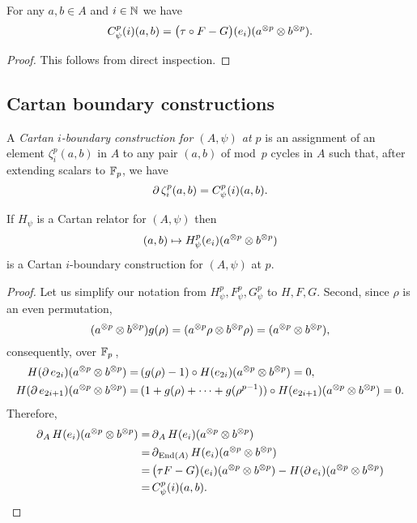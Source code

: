 \begin{lemma}
	For any $a,b \in A$ and $i \in \mathbb{N}$ we have
	\[
	C^p_\psi(i)(a,b) =
	\big(\tau \mathbin{\circ} F - G\big)(e_i)(a^{\otimes p} \otimes b^{\otimes p}).
	\]
\end{lemma}

\begin{proof}
	This follows from direct inspection.
\end{proof}

\subsection{Cartan boundary constructions}\label{ss:cartan_coboundary}

A \textit{Cartan $i$-boundary construction for $(A,\psi)$ at $p$} is an assignment of an element $\zeta_i^p(a,b)$ in $A$ to any pair $(a,b)$ of mod~$p$ cycles in $A$ such that, after extending scalars to ${\mathbb{F}_p}$, we have
\[
\operatorname{\partial} \zeta_i^p(a,b) = C_\psi^p(i)(a, b).
\]

\begin{theorem}
	If $H_\psi$ is a Cartan relator for $(A, \psi)$ then
	\[
	(a,b) \mapsto H_\psi^p(e_i)(a^{\otimes p} \otimes b^{\otimes p})
	\]
	is a Cartan $i$-boundary construction for $(A, \psi)$ at $p$.
\end{theorem}

\begin{proof}
	Let us simplify our notation from $H_\psi^p, F_\psi^p, G_\psi^p$ to $H, F, G$.
	Second, since $\rho$ is an even permutation,
	\[
	(a^{\otimes p} \otimes b^{\otimes p}) g(\rho) = (a^{\otimes p} \rho \otimes b^{\otimes p} \rho ) = (a^{\otimes p} \otimes b^{\otimes p}),
	\]
	consequently, over ${\mathbb{F}_p}$\,,
	\begin{align*}
		H(\operatorname{\partial} e_{2i})(a^{\otimes p} \otimes b^{\otimes p}) =&\,
		(g(\rho) - 1) \mathbin{\circ} H(e_{2i})(a^{\otimes p} \otimes b^{\otimes p}) = 0, \\
		H(\operatorname{\partial} e_{2i+1})(a^{\otimes p} \otimes b^{\otimes p}) =&\,
		(1+g(\rho)+\dots+g(\rho^{p-1})) \mathbin{\circ} H(e_{2i+1})(a^{\otimes p} \otimes b^{\otimes p}) = 0.
	\end{align*}
	Therefore,
	\begin{align*}
		\operatorname{\partial}_A H(e_i)(a^{\otimes p} \otimes b^{\otimes p}) =&
		\operatorname{\partial}_A H(e_i)(a^{\otimes p} \otimes b^{\otimes p}) \\ =&
		\operatorname{\partial}_{\mathrm{End}(A)} H(e_i)(a^{\otimes p} \otimes b^{\otimes p}) \\ =& \,
		\big(\tau F - G\big)(e_i)(a^{\otimes p} \otimes b^{\otimes p}) -
		H(\operatorname{\partial} e_i)(a^{\otimes p} \otimes b^{\otimes p}) \\ =&\,
		C^p_\psi(i)(a,b).\qedhere
	\end{align*}
\end{proof}